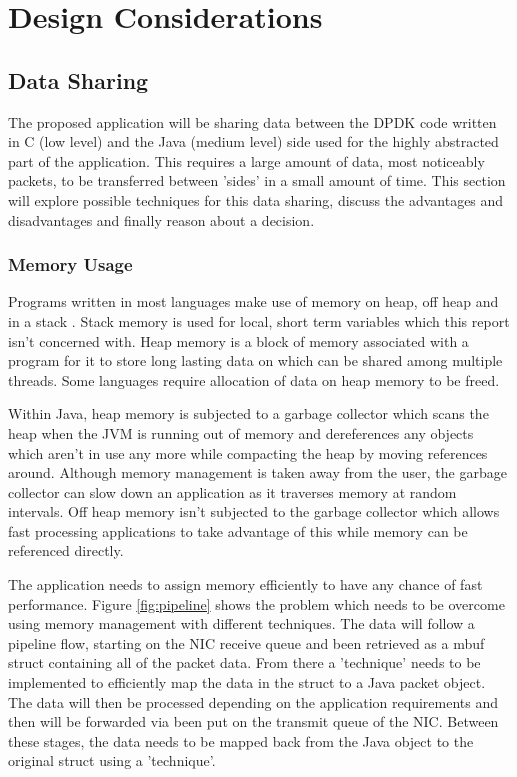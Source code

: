 \documentclass[final_report.tex]{subfiles}
\begin{document}
\section{Design Considerations}
\label{sec:design}

\subsection{Data Sharing}
The proposed application will be sharing data between the DPDK code written in C (low level) and the Java (medium level) side used for the highly abstracted part of the application. This requires a large amount of data, most noticeably packets, to be transferred between 'sides' in a small amount of time. This section will explore possible techniques for this data sharing, discuss the advantages and disadvantages and finally reason about a decision.

\subsubsection{Memory Usage}
Programs written in most languages make use of memory on heap, off heap and in a stack \cite{dzone}. Stack memory is used for local, short term variables which this report isn't concerned with. Heap memory is a block of memory associated with a program for it to store long lasting data on which can be shared among multiple threads. Some languages require allocation of data on heap memory to be freed.

Within Java, heap memory is subjected to a garbage collector which scans the heap when the JVM is running out of memory and dereferences any objects which aren't in use any more while compacting the heap by moving references around. Although memory management is taken away from the user, the garbage collector can slow down an application as it traverses memory at random intervals. Off heap memory isn't subjected to the garbage collector which allows fast processing applications to take advantage of this while memory can be referenced directly.

The application needs to assign memory efficiently to have any chance of fast performance. Figure \ref{fig:pipeline} shows the problem which needs to be overcome using memory management with different techniques. The data will follow a pipeline flow, starting on the NIC receive queue and been retrieved as a mbuf struct containing all of the packet data. From there a 'technique' needs to be implemented to efficiently map the data in the struct to a Java packet object. The data will then be processed depending on the application requirements and then will be forwarded via been put on the transmit queue of the NIC. Between these stages, the data needs to be mapped back from the Java object to the original struct using a 'technique'.
\end{document}
